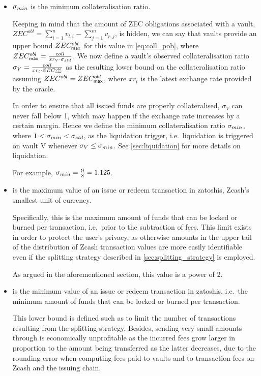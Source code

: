 \begin{itemize}
    \item $\sigma_{min}$ is the minimum collateralisation ratio.
    
    Keeping in mind that the amount of ZEC obligations associated with a vault, $ZEC^{obl} = \sum_{i=1}^{n} v_{l,i} - \sum_{j=1}^{m} v_{r,j}$, is hidden, we can say that vaults provide an upper bound $ZEC^{obl}_\mathsf{max}$ for this value in \cref{eq:coll_pob}, where $ZEC^{obl}_\mathsf{max} = \frac{coll}{xr_V \cdot \sigma_{std}}$.
    We now define a vault's observed collateralisation ratio $\sigma_{V} = \frac{coll}{xr_t \cdot ZEC^{obl}_\mathsf{max}}$ as the resulting lower bound on the collateralisation ratio assuming $ZEC^{obl} = ZEC^{obl}_\mathsf{max}$, where $xr_t$ is the latest exchange rate provided by the oracle.
    
    In order to ensure that all issued funds are properly collateralised, $\sigma_{V}$ can never fall below 1, which may happen if the exchange rate increases by a certain margin.
    Hence we define the minimum collateralisation ratio $\sigma_{min}$, where $1 < \sigma_{min} < \sigma_{std}$, as the liquidation trigger, i.e.\ liquidation is triggered on vault V whenever $\sigma_{V} \leq \sigma_{min}$.
    See \cref{sec:liquidation} for more details on liquidation.
    
    For example, $\sigma_{min} = \frac{9}{8} = 1.125$.
    
    \item \vmax is the maximum value of an issue or redeem transaction in zatoshis, Zcash's smallest unit of currency.
    
    Specifically, this is the maximum amount of funds that can be locked or burned per transaction, i.e.\ prior to the subtraction of fees.
    This limit exists in order to protect the user's privacy, as otherwise amounts in the upper tail of the distribution of Zcash transaction values are more easily identifiable even if the splitting strategy described in \cref{sec:splitting_strategy} is employed.
    
    As argued in the aforementioned section, this value is a power of 2.
    
    \item \vmin is the minimum value of an issue or redeem transaction in zatoshis, i.e.\ the minimum amount of funds that can be locked or burned per transaction.
    
    This lower bound is defined such as to limit the number of transactions resulting from the splitting strategy.
    Besides, sending very small amounts through \zclaim is economically unprofitable as the incurred fees grow larger in proportion to the amount being transferred as the latter decreases, due to the rounding error when computing fees paid to vaults and to transaction fees on Zcash and the issuing chain.
    

\end{itemize}
